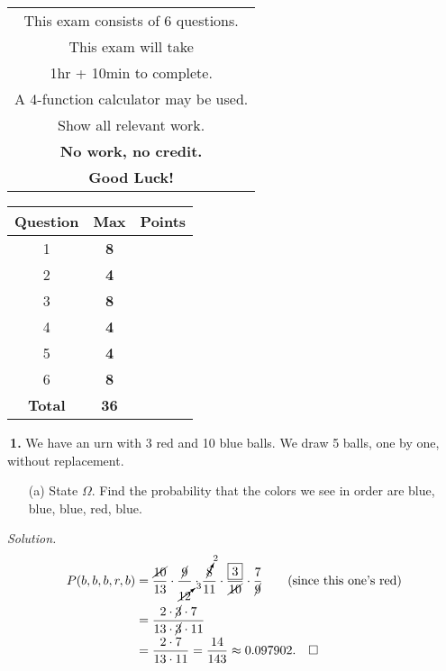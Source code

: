\documentclass[12pt]{report}
\begin{document}
\begin{minipage}[b]{80mm}
\begin{tabular}{c}
\noindent This exam consists of 6 questions. \\

\noindent This exam will take \\1hr + 10min to complete. \\

\noindent A 4-function calculator may be used.\\

\noindent Show all relevant work.\\
\noindent \textbf{No work, no credit.}\\

\noindent \textbf{Good Luck!}\\
\end{tabular}
\end{minipage}
\begin{minipage}[b]{80mm}
\begin{tabular}{ |c|c|c| }
	\hline
	\textbf{Question} & \textbf{Max} & \textbf{Points} \\
	\hline
	\hline
	1& \textbf{8} & \\
	\hline
	2& \textbf{4} & \\
	\hline
	3& \textbf{8} & \\
	\hline
	4& \textbf{4} & \\
	\hline
	5& \textbf{4} & \\
	\hline
	6& \textbf{8} & \\
	\hline
	\hline
	\textbf{Total} & \textbf{36} & \\
	\hline
\end{tabular}
\end{minipage}

\pagebreak








\noindent {} $~$\textbf{1.} We have an urn with 3 red and 10 blue balls. We draw 5 balls, one by one, without replacement. 
\begin{itemize}
\item [(a)] State $\Omega$. Find the probability that the colors we see in order are blue, blue, blue, red, blue.		%
\end{itemize}
\textit{Solution. } \\
\begin{align*}
P(b,b,b,r,b)&=\frac{\cancel{10}}{13}\cdot \frac{\cancel{9}}{\cancelto{3}{12}}\cdot\frac{\cancelto{2}{8}}{11}\cdot\frac{\boxed{3}}{\cancel{10}}\cdot\frac{7}{\cancel{9}}\tag{since this one's red}\\
&=\frac{2\cdot\cancel{3}\cdot7}{13\cdot\cancel{3}\cdot11}\\
&=\frac{2\cdot7}{13\cdot11}=\frac{14}{143}\approx 0.097902.~~~\square
\end{align*}
\end{document}
